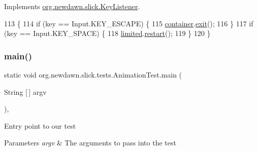 Implements \mbox{\hyperlink{interfaceorg_1_1newdawn_1_1slick_1_1_key_listener_ac0b0568a21ef486c4f51382614c196ef}{org.\+newdawn.\+slick.\+Key\+Listener}}.


\begin{DoxyCode}
113                                             \{
114         \textcolor{keywordflow}{if} (key == Input.KEY\_ESCAPE) \{
115             \mbox{\hyperlink{classorg_1_1newdawn_1_1slick_1_1tests_1_1_animation_test_ad2142f4fe5667df82eb8ead44f81e1b1}{container}}.\mbox{\hyperlink{classorg_1_1newdawn_1_1slick_1_1_game_container_a6d888463695fe3aac4123e72ac14480f}{exit}}();
116         \}
117         \textcolor{keywordflow}{if} (key == Input.KEY\_SPACE) \{
118             \mbox{\hyperlink{classorg_1_1newdawn_1_1slick_1_1tests_1_1_animation_test_a21a680962a0736500e3a7d72caa1de4c}{limited}}.\mbox{\hyperlink{classorg_1_1newdawn_1_1slick_1_1_animation_a75484f44d2032efcf9f14dd303e35139}{restart}}();
119         \}
120     \}
\end{DoxyCode}
\mbox{\label{classorg_1_1newdawn_1_1slick_1_1tests_1_1_animation_test_a00e94fec1ac8af9337259e958e88aa74}} 
\subsubsection{\texorpdfstring{main()}{main()}}
{\footnotesize\ttfamily static void org.\+newdawn.\+slick.\+tests.\+Animation\+Test.\+main (\begin{DoxyParamCaption}\item[{String \mbox{[}$\,$\mbox{]}}]{argv }\end{DoxyParamCaption})\hspace{0.3cm}{\ttfamily [inline]}, {\ttfamily [static]}}

Entry point to our test


\begin{DoxyParams}{Parameters}
{\em argv} & The arguments to pass into the test \\
\hline
\end{DoxyParams}

